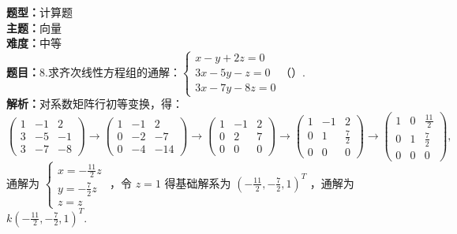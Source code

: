 \documentclass{ctexart}
\newenvironment{question}[5]{%
	\noindent\textbf{题型：}#1\\
	\textbf{主题：}#2\\
	\textbf{难度：}#3\\
	\textbf{题目：}#4\\
	\textbf{解析：}#5\\
	\vspace{1em}
}{}
\begin{document}
	\begin{question}
		{计算题}
		{向量}
		{中等}
		{8.求齐次线性方程组的通解：\(\left\{\begin{array}{l}x-y+2z=0 \\ 3x-5y-z=0 \\ 3x-7y-8z=0\end{array}\right.\)（）.}
		{对系数矩阵行初等变换，得：
			\[
			\left(\begin{array}{rrr}
				1 & -1 & 2 \\
				3 & -5 & -1 \\
				3 & -7 & -8
			\end{array}\right) \rightarrow \left(\begin{array}{ccc}
				1 & -1 & 2 \\
				0 & -2 & -7 \\
				0 & -4 & -14
			\end{array}\right) \rightarrow \left(\begin{array}{ccc}
				1 & -1 & 2 \\
				0 & 2 & 7 \\
				0 & 0 & 0
			\end{array}\right) \rightarrow \left(\begin{array}{ccc}
				1 & -1 & 2 \\
				0 & 1 & \frac{7}{2} \\
				0 & 0 & 0
			\end{array}\right) \rightarrow \left(\begin{array}{ccc}
				1 & 0 & \frac{11}{2} \\
				0 & 1 & \frac{7}{2} \\
				0 & 0 & 0
			\end{array}\right),
			\]
			通解为 \(\left\{\begin{array}{l}x=-\frac{11}{2}z \\ y=-\frac{7}{2}z \\ z=z\end{array}\right.\) ，令 \(z=1\) 得基础解系为 \(\left(-\frac{11}{2},-\frac{7}{2},1\right)^T\) ，通解为 \(k\left(-\frac{11}{2},-\frac{7}{2},1\right)^T\).}
	\end{question}
	
\end{document}
